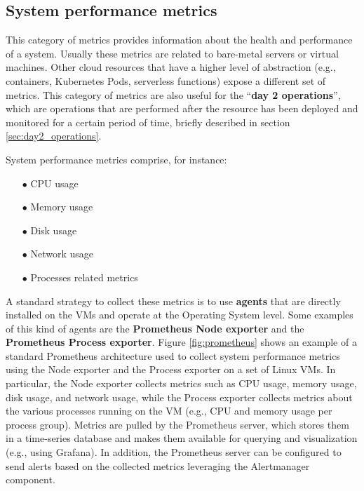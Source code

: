 \subsection{System performance metrics}

This category of metrics provides information about the health and performance of a system.
Usually these metrics are related to bare-metal servers or virtual machines.
Other cloud resources that have a higher level of abstraction (e.g., containers, Kubernetes Pods, serverless functions) expose a different set of metrics.
This category of metrics are also useful for the ``\textbf{day 2 operations}'', which are operations that are performed after the resource has been deployed and monitored for a certain period of time, briefly described in section \ref{sec:day2_operations}.

System performance metrics comprise, for instance:
\begin{itemize}[itemsep=0.2pt, topsep=1pt]
  \item[$\bullet$] CPU usage
  \item[$\bullet$] Memory usage
  \item[$\bullet$] Disk usage
  \item[$\bullet$] Network usage
  \item[$\bullet$] Processes related metrics \\
\end{itemize}

A standard strategy to collect these metrics is to use \textbf{agents} that are directly installed on the VMs and operate at the Operating System level.
Some examples of this kind of agents are the \textbf{Prometheus Node exporter} and the \textbf{Prometheus Process exporter}.
Figure \ref{fig:prometheus} shows an example of a standard Prometheus architecture used to collect system performance metrics using the Node exporter and the Process exporter on a set of Linux VMs.
In particular, the Node exporter collects metrics such as CPU usage, memory usage, disk usage, and network usage, while the Process exporter collects metrics about the various processes running on the VM (e.g., CPU and memory usage per process group).
Metrics are pulled by the Prometheus server, which stores them in a time-series database and makes them available for querying and visualization (e.g., using Grafana). 
In addition, the Prometheus server can be configured to send alerts based on the collected metrics leveraging the Alertmanager component. \newline

